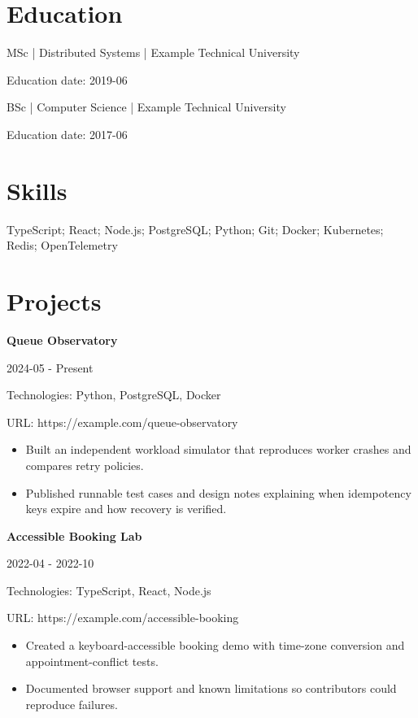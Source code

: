 \documentclass[11pt,a4paper]{article}
\begin{document}
\section*{Education}
MSc | Distributed Systems | Example Technical University\par
Education date: 2019-06\par
BSc | Computer Science | Example Technical University\par
Education date: 2017-06\par
\section*{Skills}
TypeScript; React; Node.js; PostgreSQL; Python; Git; Docker; Kubernetes; Redis; OpenTelemetry
\section*{Projects}
\textbf{Queue Observatory}\par
2024-05 - Present\par
Technologies: Python, PostgreSQL, Docker\par
URL: https://example.com/queue-observatory\par
\begin{itemize}
\item Built an independent workload simulator that reproduces worker crashes and compares retry policies.
\item Published runnable test cases and design notes explaining when idempotency keys expire and how recovery is verified.
\end{itemize}
\textbf{Accessible Booking Lab}\par
2022-04 - 2022-10\par
Technologies: TypeScript, React, Node.js\par
URL: https://example.com/accessible-booking\par
\begin{itemize}
\item Created a keyboard-accessible booking demo with time-zone conversion and appointment-conflict tests.
\item Documented browser support and known limitations so contributors could reproduce failures.
\end{itemize}
\end{document}
